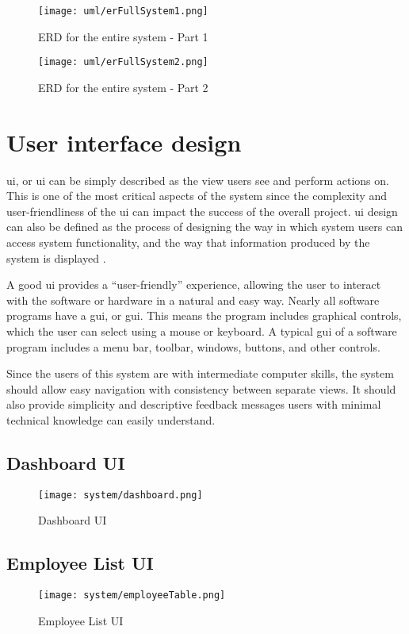\documentclass[12pt]{report}
\begin{document}
\begin{figure}[H]
	\centering
	\texttt{[image: uml/erFullSystem1.png]}
	\caption{ERD for the entire system - Part 1}
\end{figure}

\begin{figure}[H]
	\centering
	\texttt{[image: uml/erFullSystem2.png]}
	\caption{ERD for the entire system - Part 2}
\end{figure}

\newpage
\section{User interface design}
\acrlong{ui}, or \acrshort{ui} can be simply described as the view users see and perform actions on. This is one of the most critical aspects of the system since the complexity and user-­friendliness of the \acrshort{ui} can impact the success of the overall project. \acrshort{ui} design can also be defined as the process of designing the way in which system users can access system functionality, and the way that information produced by the system is displayed \cite{sommerville_2008_se}.

A good \acrshort{ui} provides a ``user-friendly'' experience, allowing the user to interact with the software or hardware in a natural and easy way. Nearly all software programs have a \acrlong{gui}, or \acrshort{gui}. This means the program includes graphical controls, which the user can select using a mouse or
keyboard. A typical \acrshort{gui} of a software program includes a menu bar, toolbar, windows, buttons, and other controls.

Since the users of this system are with intermediate computer skills, the system should allow easy navigation with consistency between separate views. It should also provide simplicity and descriptive feedback messages users with minimal technical knowledge can easily understand.

\subsection{Dashboard UI}
\begin{figure}[H]
	\centering
	\texttt{[image: system/dashboard.png]}
	\caption{Dashboard UI}
\end{figure}

\subsection{Employee List UI}
\begin{figure}[H]
	\centering
	\texttt{[image: system/employeeTable.png]}
	\caption{Employee List UI}
\end{figure}
\end{document}
